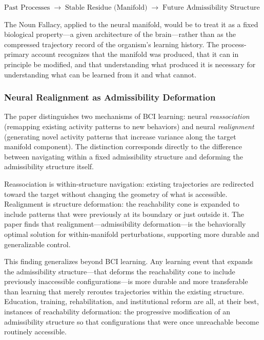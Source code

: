 \documentclass[12pt, a4paper]{article}
\theoremstyle{plain}
\theoremstyle{definition}
\theoremstyle{remark}
\begin{document}
\begin{center}
$\text{Past Processes} \;\longrightarrow\; \text{Stable Residue (Manifold)}
\;\longrightarrow\; \text{Future Admissibility Structure}$
\end{center}

The Noun Fallacy, applied to the neural manifold, would be to treat it
as a fixed biological property---a given architecture of the brain---rather
than as the compressed trajectory record of the organism's learning
history. The process-primary account recognizes that the manifold was
produced, that it can in principle be modified, and that understanding
what produced it is necessary for understanding what can be learned from
it and what cannot.

\subsubsection*{Neural Realignment as Admissibility Deformation}

The paper distinguishes two mechanisms of BCI learning: neural
\emph{reassociation} (remapping existing activity patterns to new behaviors)
and neural \emph{realignment} (generating novel activity patterns that increase
variance along the target manifold component). The distinction corresponds
directly to the difference between navigating within a fixed admissibility
structure and deforming the admissibility structure itself.

Reassociation is within-structure navigation: existing trajectories are
redirected toward the target without changing the geometry of what is
accessible. Realignment is structure deformation: the reachability cone
is expanded to include patterns that were previously at its boundary or
just outside it. The paper finds that realignment---admissibility
deformation---is the behaviorally optimal solution for within-manifold
perturbations, supporting more durable and generalizable control.

This finding generalizes beyond BCI learning. Any learning event that
expands the admissibility structure---that deforms the reachability cone
to include previously inaccessible configurations---is more durable and
more transferable than learning that merely reroutes trajectories within
the existing structure. Education, training, rehabilitation, and
institutional reform are all, at their best, instances of reachability
deformation: the progressive modification of an admissibility structure
so that configurations that were once unreachable become routinely accessible.
\end{document}

